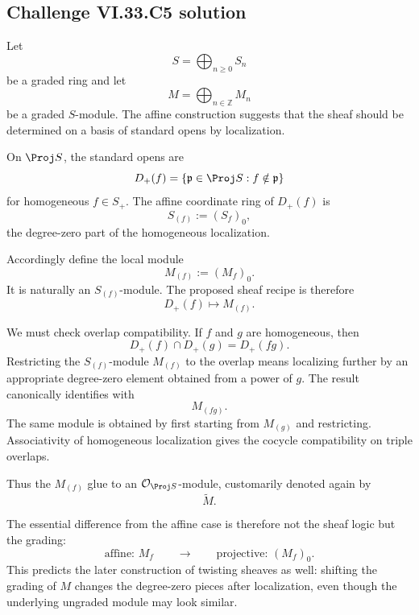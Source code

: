 \subsection*{Challenge VI.33.C5 solution}
\begin{solution}
Let
\[
S=\bigoplus_{n\ge0}S_n
\]
be a graded ring and let
\[
M=\bigoplus_{n\in\mathbb Z}M_n
\]
be a graded \(S\)-module.  The affine construction suggests that the sheaf should be determined on a basis of
standard opens by localization.

On \(\Proj S\), the standard opens are
\[
D_+(f)
=
\{\mathfrak p\in\Proj S:f\notin\mathfrak p\}
\]
for homogeneous \(f\in S_+\).  The affine coordinate ring of \(D_+(f)\) is
\[
S_{(f)}
:=
(S_f)_0,
\]
the degree-zero part of the homogeneous localization.

Accordingly define the local module
\[
M_{(f)}
:=
(M_f)_0.
\]
It is naturally an \(S_{(f)}\)-module.  The proposed sheaf recipe is therefore
\[
\boxed{
D_+(f)\longmapsto M_{(f)}.
}
\]

We must check overlap compatibility.  If \(f\) and \(g\) are homogeneous, then
\[
D_+(f)\cap D_+(g)=D_+(fg).
\]
Restricting the \(S_{(f)}\)-module \(M_{(f)}\) to the overlap means localizing further by an appropriate
degree-zero element obtained from a power of \(g\).  The result canonically identifies with
\[
M_{(fg)}.
\]
The same module is obtained by first starting from \(M_{(g)}\) and restricting.  Associativity of homogeneous
localization gives the cocycle compatibility on triple overlaps.

Thus the \(M_{(f)}\) glue to an \(\mathcal O_{\Proj S}\)-module, customarily denoted again by
\[
\widetilde M.
\]

The essential difference from the affine case is therefore not the sheaf logic but the grading:
\[
\boxed{
\text{affine: }M_f
\qquad\longrightarrow\qquad
\text{projective: }(M_f)_0.
}
\]
This predicts the later construction of twisting sheaves as well: shifting the grading of \(M\) changes the
degree-zero pieces after localization, even though the underlying ungraded module may look similar.
\end{solution}
